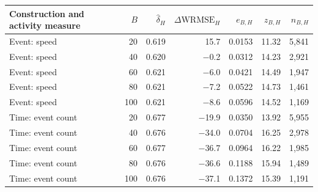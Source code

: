 \begin{tabular}{lrrrrrr}
\toprule
Construction and activity measure & $B$ & $\widehat{\delta}_{H}$ & $\Delta\mathrm{WRMSE}_{H}$ & $e_{B,H}$ & $z_{B,H}$ & $n_{B,H}$ \\
\midrule
Event: speed & 20 & 0.619 & 15.7 & 0.0153 & 11.32 & 5,841 \\
Event: speed & 40 & 0.620 & $-$0.2 & 0.0312 & 14.23 & 2,921 \\
Event: speed & 60 & 0.621 & $-$6.0 & 0.0421 & 14.49 & 1,947 \\
Event: speed & 80 & 0.621 & $-$7.2 & 0.0522 & 14.73 & 1,461 \\
Event: speed & 100 & 0.621 & $-$8.6 & 0.0596 & 14.52 & 1,169 \\
\midrule
Time: event count & 20 & 0.677 & $-$19.9 & 0.0350 & 13.92 & 5,955 \\
Time: event count & 40 & 0.676 & $-$34.0 & 0.0704 & 16.25 & 2,978 \\
Time: event count & 60 & 0.677 & $-$36.7 & 0.0964 & 16.22 & 1,985 \\
Time: event count & 80 & 0.676 & $-$36.6 & 0.1188 & 15.94 & 1,489 \\
Time: event count & 100 & 0.676 & $-$37.1 & 0.1372 & 15.39 & 1,191 \\
\bottomrule
\end{tabular}
